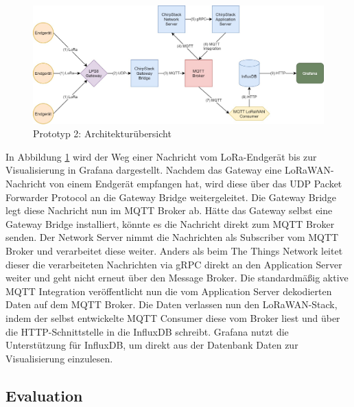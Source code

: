 \begin{figure}[H]
  \vspace{10pt}
  \begin{center}
    \includegraphics[width=1\textwidth]{./images/chirpstack_prototyp_architecture.jpg}
  \end{center}
  \vspace{-5pt}
  \caption[Prototyp 2: Architekturübersicht]{Prototyp 2: Architekturübersicht}
  \label{fig:chirpstack_prototype_architecture}
  \vspace{-10pt}
\end{figure}

In Abbildung \ref{fig:chirpstack_prototype_architecture} wird der Weg einer Nachricht vom LoRa-Endgerät bis zur Visualisierung in Grafana dargestellt. Nachdem das Gateway eine LoRaWAN-Nachricht von einem Endgerät empfangen hat, wird diese über das UDP Packet Forwarder Protocol an die Gateway Bridge weitergeleitet. Die Gateway Bridge legt diese Nachricht nun im MQTT Broker ab. Hätte das Gateway selbst eine Gateway Bridge installiert, könnte es die Nachricht direkt zum MQTT Broker senden. Der Network Server nimmt die Nachrichten als Subscriber vom MQTT Broker und verarbeitet diese weiter. Anders als beim The Things Network leitet dieser die verarbeiteten Nachrichten via gRPC direkt an den Application Server weiter und geht nicht erneut über den Message Broker. Die standardmäßig aktive MQTT Integration veröffentlicht nun die vom Application Server dekodierten Daten auf dem MQTT Broker. Die Daten verlassen nun den LoRaWAN-Stack, indem der selbst entwickelte MQTT Consumer diese vom Broker liest und über die HTTP-Schnittstelle in die InfluxDB schreibt. Grafana nutzt die Unterstützung für InfluxDB, um direkt aus der Datenbank Daten zur Visualisierung einzulesen. 

\subsection{Evaluation}
\label{sec:Prot:procontra2}

